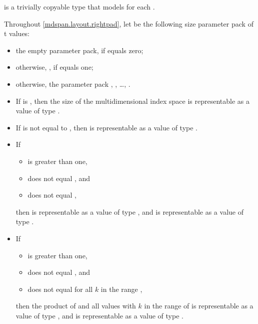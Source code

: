 \pnum
{} is a trivially copyable type
that models  for each .

\pnum
Throughout \ref{mdspan.layout.rightpad},
let  be the following
size  parameter pack of t values:
\begin{itemize}
\item
the empty parameter pack, if  equals zero;
\item
otherwise, , if  equals one;
\item
otherwise, the parameter pack , , \ldots, .
\end{itemize}

\pnum
\mandates
\begin{itemize}
\item
If  is ,
then the size of the multidimensional index space 
is representable as a value of type .
\item
If  is not equal to , then
 is representable as a value of type .
\item
If
\begin{itemize}
\item
{} is greater than one,
\item
{} does not equal , and
\item
{} does not equal ,
\end{itemize}
then 
is representable as a value of type , and
is representable as a value of type .
\item
If
\begin{itemize}
\item
{} is greater than one,
\item
{} does not equal , and
\item
{} does not equal 
for all $k$ in the range ,
\end{itemize}
then the product of
 and
all values 
with $k$ in the range of 
is representable as a value of type , and
is representable as a value of type .
\end{itemize}

